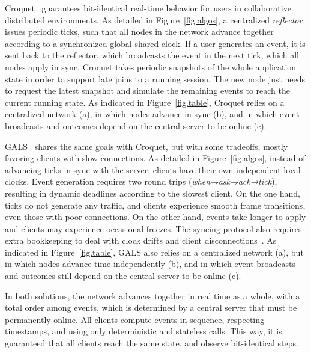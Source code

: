 \documentclass[12pt]{article}
\begin{document}
Croquet~\cite{croquet,croquet.site} guarantees bit-identical real-time behavior
for users in collaborative distributed environments.
%
As detailed in Figure~\ref{fig.algos}, a centralized \emph{reflector} issues
periodic ticks, such that all nodes in the network advance together according
to a synchronized global shared clock.
If a user generates an event, it is sent back to the reflector, which
broadcasts the event in the next tick, which all nodes apply in sync.
%
Croquet takes periodic snapshots of the whole application state in order to
support late joins to a running session.
The new node just needs to request the latest snapshot and simulate the
remaining events to reach the current running state.
%
As indicated in Figure~\ref{fig.table}, Croquet relies on a centralized
network (a), in which nodes advance in sync (b), and in which event broadcasts
and outcomes depend on the central server to be online (c).

GALS~\cite{gals} shares the same goals with Croquet, but with some tradeoffs,
mostly favoring clients with slow connections.
As detailed in Figure~\ref{fig.algos}, instead of advancing ticks in sync with
the server, clients have their own independent local clocks.
Event generation requires two round trips (\emph{when→ask→ack→tick}), resulting
in dynamic deadlines according to the slowest client.
%
On the one hand, ticks do not generate any traffic, and clients experience
smooth frame transitions, even those with poor connections.
On the other hand, events take longer to apply and clients may experience
occasional freezes.
The syncing protocol also requires extra bookkeeping to deal with clock drifts
and client disconnections~\cite{gals}.
%
As indicated in Figure~\ref{fig.table}, GALS also relies on a centralized
network (a), but in which nodes advance time independently (b), and in which
event broadcasts and outcomes still depend on the central server to be online
(c).

In both solutions, the network advances together in real time as a whole, with
a total order among events, which is determined by a central server that must
be permanently online.
All clients compute events in sequence, respecting timestamps, and using only
deterministic and stateless calls.
This way, it is guaranteed that all clients reach the same state, and
observe bit-identical steps.
\end{document}
